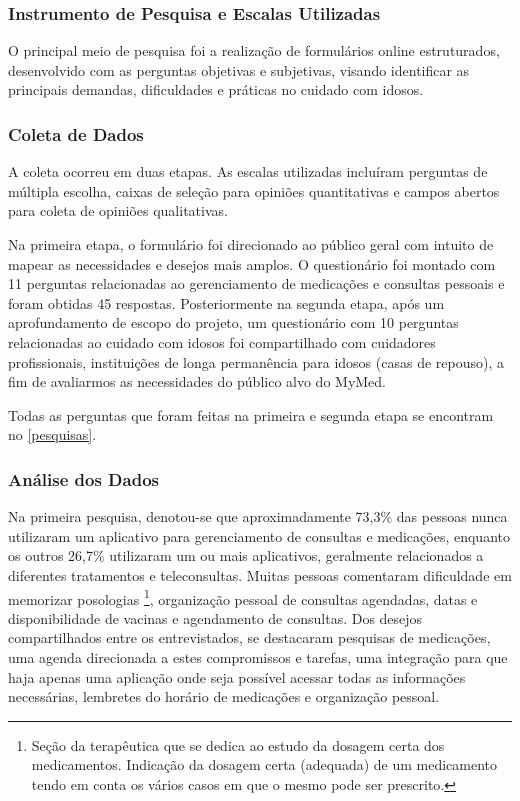 \documentclass[
	article,			%
	12pt,				%
	oneside,			%
	a4paper,			%
    BIBLATEX,           %
	english,			%
	brazil,				%
	sumario=tradicional
	]{abntex2}
\newcommand\nomeprojeto{MyMed}
\begin{document}
\subsubsection{Instrumento de Pesquisa e Escalas Utilizadas}

O principal meio de pesquisa foi a realização de formulários online estruturados, desenvolvido com as perguntas objetivas e subjetivas, visando identificar as principais demandas, dificuldades e práticas no cuidado com idosos.

\subsubsection{Coleta de Dados}

A coleta ocorreu em duas etapas. As escalas utilizadas incluíram perguntas de múltipla escolha, caixas de seleção para opiniões quantitativas e campos abertos para coleta de opiniões qualitativas. 

Na primeira etapa, o formulário foi direcionado ao público geral com intuito de mapear as necessidades e desejos mais amplos. O questionário foi montado com 11 perguntas relacionadas ao gerenciamento de medicações e consultas pessoais e foram obtidas 45 respostas. Posteriormente na segunda etapa, após um aprofundamento de escopo do projeto, um questionário com 10 perguntas relacionadas ao cuidado com idosos foi compartilhado com cuidadores profissionais, instituições de longa permanência para idosos (casas de repouso), a fim de avaliarmos as necessidades do público alvo do \nomeprojeto. 

Todas as perguntas que foram feitas na primeira e segunda etapa se encontram no \autoref{pesquisas}.

\subsubsection{Análise dos Dados}

Na primeira pesquisa, denotou-se que aproximadamente 73,3\% das pessoas nunca utilizaram um aplicativo para gerenciamento de consultas e medicações, enquanto os outros 26,7\% utilizaram um ou mais aplicativos, geralmente relacionados a diferentes tratamentos e teleconsultas. Muitas pessoas comentaram dificuldade em memorizar posologias
\footnote[1]{Seção da terapêutica que se dedica ao estudo da dosagem certa dos medicamentos. Indicação da dosagem certa (adequada) de um medicamento tendo em conta os vários casos em que o mesmo pode ser prescrito.}, 
organização pessoal de consultas agendadas, datas e disponibilidade de vacinas e agendamento de consultas. Dos desejos compartilhados entre os entrevistados, se destacaram pesquisas de medicações, uma agenda direcionada a estes compromissos e tarefas, uma integração para que haja apenas uma aplicação onde seja possível acessar todas as informações necessárias, lembretes do horário de medicações e organização pessoal.
\end{document}
